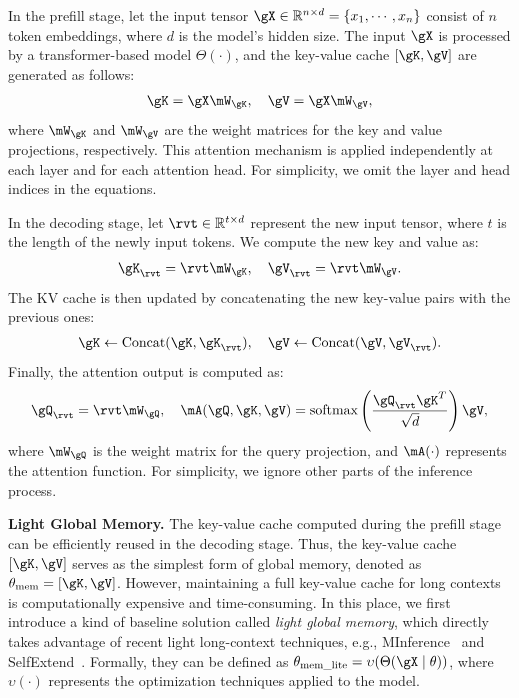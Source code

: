 \documentclass[sigconf]{acmart}
\begin{document}
In the prefill stage, let the input tensor $\gX \in \mathbb{R}^{n \times d} = \{x_1, \cdots, x_n\}$ consist of $n$ token embeddings, where $d$ is the model's hidden size. The input $\gX$ is processed by a transformer-based model $\Theta(\cdot)$, and the key-value cache $[\gK, \gV]$ are generated as follows:
\begin{align}
\gK = \gX \mW_\gK, \quad \gV = \gX \mW_\gV,
\end{align}
where $\mW_\gK$ and $\mW_\gV$ are the weight matrices for the key and value projections, respectively. This attention mechanism is applied independently at each layer and for each attention head. For simplicity, we omit the layer and head indices in the equations.

In the decoding stage, let $\rvt \in \mathbb{R}^{t \times d}$ represent the new input tensor, where $t$ is the length of the newly input tokens. We compute the new key and value as:
\begin{align}
\gK_\rvt = \rvt \mW_\gK, \quad \gV_\rvt = \rvt \mW_\gV.
\end{align}
The KV cache is then updated by concatenating the new key-value pairs with the previous ones:
\begin{align}
\gK \leftarrow \text{Concat}(\gK, \gK_\rvt), \quad \gV \leftarrow \text{Concat}(\gV, \gV_\rvt).
\end{align}
Finally, the attention output is computed as:
\begin{align}
\gQ_\rvt = \rvt \mW_\gQ, \quad
\mA(\gQ, \gK, \gV) = \text{softmax}\left(\frac{\gQ_\rvt \gK^T}{\sqrt{d}}\right) \gV,
\end{align}
where $\mW_\gQ$ is the weight matrix for the query projection, and $\mA(\cdot)$ represents the attention function. For simplicity, we ignore other parts of the inference process.

\textbf{Light Global Memory.}
The key-value cache computed during the prefill stage can be efficiently reused in the decoding stage. Thus, the key-value cache $[\gK, \gV]$ serves as the simplest form of global memory, denoted as $\theta_{\text{mem}} = [\gK, \gV]$. However, maintaining a full key-value cache for long contexts is computationally expensive and time-consuming. 
In this place, we first introduce a kind of baseline solution called \textit{light global memory}, which directly takes advantage of recent light long-context techniques, e.g., MInference~\cite{jiang2024minference} and SelfExtend~\cite{jin2024llmmaybelonglmselfextend}. Formally, they can be defined as $\theta_{\text{mem\_lite}} = \upsilon(\Theta(\gX \mid \theta))$, where $\upsilon(\cdot)$ represents the optimization techniques applied to the model. 
\end{document}
